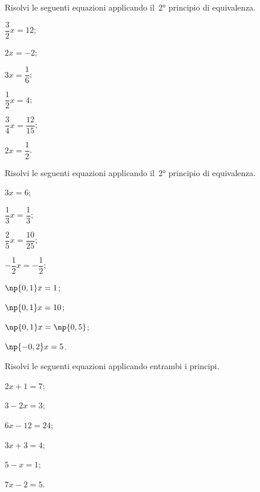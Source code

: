 \begin{esercizio}
\label{ese:15.7}
Risolvi le seguenti equazioni applicando il~2° principio di equivalenza.
\begin{multicols}{3}
\begin{enumeratea}
\spazielenx
 \item $\dfrac{3}{2}x=12$;
 \item $2x=-2$;
 \item $3x=\dfrac{1}{6}$;
 \item $\dfrac{1}{2}x=4$;
 \item $\dfrac{3}{4}x=\dfrac{12}{15}$;
 \item $2x=\dfrac{1}{2}$.
\end{enumeratea}
\end{multicols}
\end{esercizio}

\pagebreak
\begin{esercizio}
\label{ese:15.8}
Risolvi le seguenti equazioni applicando il~2° principio di equivalenza.
\begin{multicols}{4}
\begin{enumeratea}
\spazielenx
 \item $3x=6$;
 \item $\dfrac{1}{3}x=\dfrac{1}{3}$;
 \item $\dfrac{2}{5}x=\dfrac{10}{25}$;
 \item $-{\dfrac{1}{2}}x=-{\dfrac{1}{2}}$;
 \item $\np{0,1}x=1$;
 \item $\np{0,1}x=10$;
 \item $\np{0,1}x=\np{0,5}$;
 \item $\np{-0,2}x=5$.
\end{enumeratea}
\end{multicols}
\end{esercizio}

\begin{esercizio}
\label{ese:15.9}
Risolvi le seguenti equazioni applicando entrambi i principi.
\begin{multicols}{3}
\begin{enumeratea}
\spazielenx
 \item $2x+1=7$;
 \item $3-2x=3$;
 \item $6x-12=24$;
 \item $3x+3=4$;
 \item $5-x=1$;
 \item $7x-2=5$.
\end{enumeratea}
\end{multicols}
\end{esercizio}

